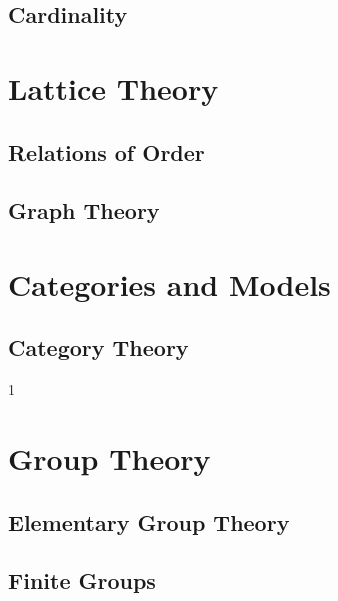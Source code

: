 \documentclass{book}                                                           %
\newcommand*{\TOPPATH}{books}
\newcommand*{\PARPATH}{\TOPPATH/}
\newcommand*{\PATH}{\TOPPATH/}
\newcounter{endpage}
\def\compilealgebra{1}
\begin{document}
            \chapter{Cardinality}
                \label{chapt:Cardinality}%
        \part{Lattice Theory}
            \chapter{Relations of Order}
                \label{chapt:Relations_of_Order}%
            \chapter{Graph Theory}
                \label{chapt:Graph_Theory}%
        \part{Categories and Models}
            \chapter{Category Theory}
                \label{chapt:Category_Theory}%
    \fi
    \clearpage

    \setcounter{endpage}{\thepage}
    \label{book:Algebra}%
    \renewcommand{\PARPATH}{\TOPPATH/Algebra}
    \setcounter{page}{\value{endpage}}

    \if\compilealgebra1
        \part{Group Theory}
            \renewcommand{\PARPATH}{\TOPPATH/Algebra/Group_Theory}
            \chapter{Elementary Group Theory}
                \renewcommand{\PATH}{\PARPATH/Elementary_Group_Theory}
                \label{chapt:Elementary_Group_Theory}%
                
                
                
            \chapter{Finite Groups}
                \renewcommand{\PATH}{\PARPATH/Finite_Groups}
                \label{chapt:Finite_Groups}%
                
                
\end{document}
